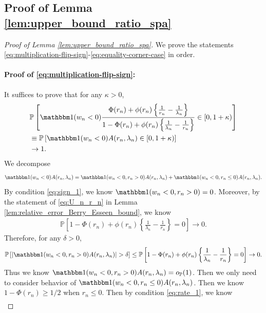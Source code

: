 \documentclass[12pt]{article}
\theoremstyle{definition}
\def\P{\mathbb{P}}
\def\P{\mathbb{P}}
\renewcommand{\P}{\mathbb{P}}							%
\newcommand{\indicator}{\mathbbm 1}						%
\begin{document}
\subsection{Proof of Lemma \ref{lem:upper_bound_ratio_spa}}

\begin{proof}[Proof of Lemma \ref{lem:upper_bound_ratio_spa}]
	We prove the statements \eqref{eq:multiplication-flip-sign}-\eqref{eq:equality-corner-case} in order.
	
	\paragraph{Proof of \eqref{eq:multiplication-flip-sign}:}

	It suffices to prove that for any $\kappa>0$, 
	\begin{align}
		&\nonumber
		\P\left[\indicator(w_n<0)\frac{\Phi(r_n)+\phi(r_n)\left\{\frac{1}{r_n}-\frac{1}{\lambda_n}\right\}}{1 - \Phi(r_n)+\phi(r_n)\left\{\frac{1}{\lambda_n}-\frac{1}{r_n}\right\}}\in [0,1 +\kappa)\right]\\
		&\nonumber
		\equiv \P\left[\indicator(w_n<0)A(r_n,\lambda_n)\in [0,1 +\kappa)\right]\\
		&\label{eq:A_rn_lamn_negative_xn}
		\rightarrow 1.
	\end{align}
	\noindent We decompose 
	\begin{align*}
		\indicator(w_n<0)A(r_n,\lambda_n)=\indicator(w_n<0,r_n>0)A(r_n,\lambda_n)+\indicator(w_n<0,r_n \leq 0)A(r_n,\lambda_n).
	\end{align*}
	By condition \eqref{eq:sign_1}, we know $\indicator(w_n<0,r_n > 0)=0$. Moreover, by the statement of \eqref{eq:U_n_r_n} in Lemma \ref{lem:relative_error_Berry_Esseen_bound}, we know
	\begin{align*}
		\P\left[1-\Phi(r_n)+\phi(r_n)\left\{\frac{1}{\lambda_n}-\frac{1}{r_n}\right\}=0\right]\rightarrow0.
	\end{align*}
	Therefore, for any $\delta>0$, 
	\begin{align*}
		\P\left[\left|\indicator(w_n<0,r_n>0)A(r_n,\lambda_n)\right|>\delta\right]\leq \P\left[1-\Phi(r_n)+\phi(r_n)\left\{\frac{1}{\lambda_n}-\frac{1}{r_n}\right\}=0\right]\rightarrow0.
	\end{align*}
	Thus we know $\indicator(w_n<0,r_n>0)A(r_n,\lambda_n)=o_{\P}(1)$. Then we only need to consider behavior of $\indicator(w_n<0,r_n \leq 0)A(r_n,\lambda_n)$. Then we know $1-\Phi(r_n)\geq 1/2$ when $r_n \leq 0$. Then by condition \eqref{eq:rate_1}, we know
	\begin{align*}

\end{align*}
\end{proof}
\end{document}
